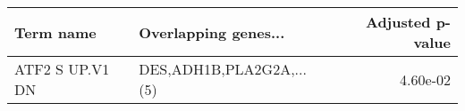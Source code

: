 \begin{tabular}{llr}
\toprule
      Term name &     Overlapping genes... &  Adjusted p-value \\
\midrule
ATF2 S UP.V1 DN & DES,ADH1B,PLA2G2A,...(5) &          4.60e-02 \\
\bottomrule
\end{tabular}
